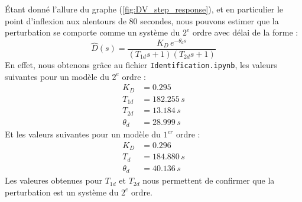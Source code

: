 \documentclass{article}
\begin{document}
Étant donné l'allure du graphe (\ref{fig:DV_step_response}), et en particulier le point d'inflexion aux alentours de 80 secondes, nous pouvons estimer que la perturbation se comporte comme un système du $2^{e}$ ordre avec délai de la forme :
\begin{equation}
    \hat{D}(s) = \frac{K_D\,e^{-\theta_d s}}{(T_{1d}s + 1)(T_{2d}s + 1)}
\end{equation}
En effet, nous obtenons grâce au fichier \texttt{Identification.ipynb}, les valeurs suivantes pour un modèle du $2^{e}$ ordre :
\begin{align*}
    K_D &= 0.295 \\
    T_{1d} &= 182.255 \,s \\
    T_{2d} &= 13.184 \,s \\
    \theta_d &= 28.999 \,s
\end{align*}
Et les valeurs suivantes pour un modèle du $1^{er}$ ordre :
\begin{align*}
    K_D &= 0.296 \\
    T_{d} &= 184.880 \,s \\
    \theta_d &= 40.136 \,s
\end{align*}
Les valeures obtenues pour $T_{1d}$ et $T_{2d}$ nous permettent de confirmer que la perturbation est un système du $2^{e}$ ordre.
\end{document}
